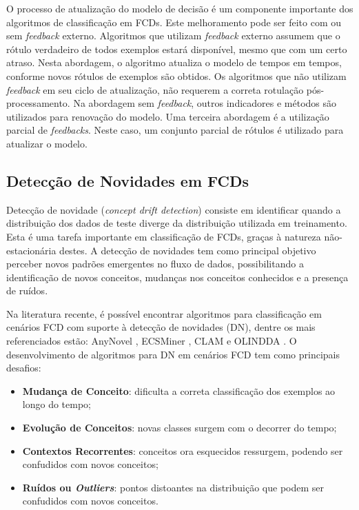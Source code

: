 \documentclass[qual, classic, a4paper]{ufbathesis}
\begin{document}
O processo de atualização do modelo de decisão é um componente importante dos algoritmos de classificação em FCDs. Este melhoramento pode ser feito com ou sem \textit{feedback} externo. Algoritmos que utilizam \textit{feedback} externo assumem que o rótulo verdadeiro de todos exemplos estará disponível, mesmo que com um certo atraso. 
Nesta abordagem, o algoritmo atualiza o modelo de tempos em tempos, conforme novos rótulos de exemplos são obtidos. Os algoritmos que não utilizam \textit{feedback} em seu ciclo de atualização, não requerem a correta rotulação pós-processamento. Na abordagem sem \textit{feedback}, outros indicadores e métodos são utilizados para renovação do modelo. Uma terceira abordagem é a utilização parcial de \textit{feedbacks}. Neste caso, um conjunto parcial de rótulos é utilizado para atualizar o modelo.

\subsection{Detecção de Novidades em FCDs}

Detecção de novidade (\textit{concept drift detection}) consiste em identificar quando a distribuição dos dados de teste diverge da distribuição utilizada em treinamento. Esta é uma tarefa importante em classificação de FCDs, graças à natureza não-estacionária destes. A detecção de novidades tem como principal objetivo perceber novos padrões emergentes no fluxo de dados, possibilitando a identificação de novos conceitos, mudanças nos conceitos conhecidos e a presença de ruídos.

Na literatura recente, é possível encontrar algoritmos para classificação em cenários FCD com suporte à detecção de novidades (DN), dentre os mais referenciados estão: AnyNovel \cite{Abdallah}, ECSMiner \cite{Masud:2010:ACC:1933307.1934606}, CLAM \cite{malkhateeb} e OLINDDA \cite{Spinosa:2009:NDA:1551768.1551770}. O desenvolvimento de algoritmos para DN em cenários FCD tem como principais desafios:

\begin{itemize}
    \item \textbf{Mudança de Conceito}: dificulta a correta classificação dos exemplos ao longo do tempo;

    \item \textbf{Evolução de Conceitos}: novas classes surgem com o decorrer do tempo;

    \item \textbf{Contextos Recorrentes}: conceitos ora esquecidos ressurgem, podendo ser confudidos com novos conceitos;

    \item \textbf{Ruídos ou \textit{Outliers}}: pontos distoantes na distribuição que podem ser confudidos com novos conceitos.
\end{itemize}
\end{document}
